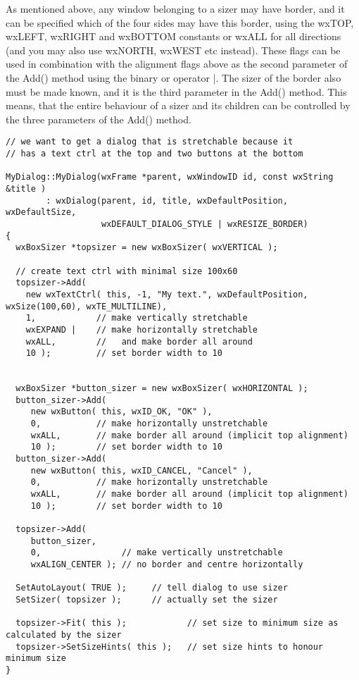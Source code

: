 As mentioned above, any window belonging to a sizer may have border, and it can be specified
which of the four sides may have this border, using the wxTOP, wxLEFT, wxRIGHT and wxBOTTOM
constants or wxALL for all directions (and you may also use wxNORTH, wxWEST etc instead). These
flags can be used in combination with the alignment flags above as the second parameter of the
Add() method using the binary or operator |. The sizer of the border also must be made known,
and it is the third parameter in the Add() method. This means, that the entire behaviour of
a sizer and its children can be controlled by the three parameters of the Add() method.

\begin{verbatim}
// we want to get a dialog that is stretchable because it
// has a text ctrl at the top and two buttons at the bottom

MyDialog::MyDialog(wxFrame *parent, wxWindowID id, const wxString &title )
        : wxDialog(parent, id, title, wxDefaultPosition, wxDefaultSize,
                   wxDEFAULT_DIALOG_STYLE | wxRESIZE_BORDER)
{
  wxBoxSizer *topsizer = new wxBoxSizer( wxVERTICAL );

  // create text ctrl with minimal size 100x60
  topsizer->Add(
    new wxTextCtrl( this, -1, "My text.", wxDefaultPosition, wxSize(100,60), wxTE_MULTILINE),
    1,            // make vertically stretchable
    wxEXPAND |    // make horizontally stretchable
    wxALL,        //   and make border all around
    10 );         // set border width to 10


  wxBoxSizer *button_sizer = new wxBoxSizer( wxHORIZONTAL );
  button_sizer->Add(
     new wxButton( this, wxID_OK, "OK" ),
     0,           // make horizontally unstretchable
     wxALL,       // make border all around (implicit top alignment)
     10 );        // set border width to 10
  button_sizer->Add(
     new wxButton( this, wxID_CANCEL, "Cancel" ),
     0,           // make horizontally unstretchable
     wxALL,       // make border all around (implicit top alignment)
     10 );        // set border width to 10

  topsizer->Add(
     button_sizer,
     0,                // make vertically unstretchable
     wxALIGN_CENTER ); // no border and centre horizontally

  SetAutoLayout( TRUE );     // tell dialog to use sizer
  SetSizer( topsizer );      // actually set the sizer

  topsizer->Fit( this );            // set size to minimum size as calculated by the sizer
  topsizer->SetSizeHints( this );   // set size hints to honour minimum size
}
\end{verbatim}

